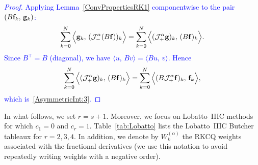 \documentclass[a4paper,10pt,reqno]{amsart}
\theoremstyle{definition}
\begin{document}
\textcolor{blue}{
\begin{proof}
Applying Lemma~\ref{ConvPropertiesRK1} componentwise to the pair $(B{\bf f}_k,\,{\bf g}_k)$:
\[
\sum_{k=0}^N \Big\langle {\bf g}_k,\,(\mathcal J_-^\alpha (B {\bf f}))_k\Big\rangle
=
\sum_{k=0}^N \Big\langle (\mathcal J_+^\alpha {\bf g})_k,\,(B {\bf f})_k\Big\rangle .
\]
Since $B^\top=B$ (diagonal), we have $\langle u,\,Bv\rangle=\langle Bu,\,v\rangle$. Hence
\[
\sum_{k=0}^N \Big\langle (\mathcal J_+^\alpha {\bf g})_k,\,(B {\bf f})_k \Big\rangle
=
\sum_{k=0}^N  \Big\langle (B \mathcal J_+^\alpha {\bf f})_k,\, {\bf f}_k \Big\rangle,
\]
which is~\eqref{AsymmetricInt:3}.
\end{proof}
}

 In what follows, we set $r=s+1$. Moreover, we focus on Lobatto~IIIC methods for which $c_1=0$ and $c_{r}=1$. Table~\ref{tab:Lobatto} lists the Lobatto~IIIC Butcher tableaux for $r=2,3,4$. In addition, we denote by $W_k^{(\alpha)}$ the RKCQ weights associated with the fractional derivatives  (we use this notation to avoid repeatedly writing weights with a negative order).
\end{document}
